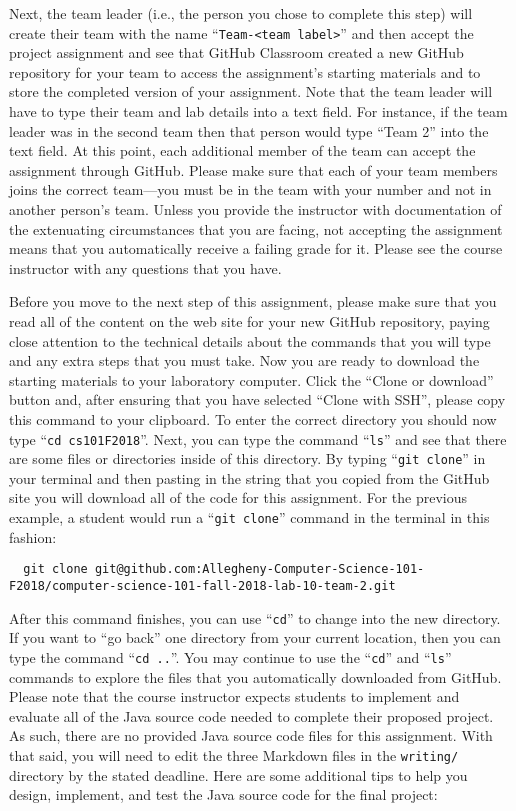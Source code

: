 \documentclass[11pt]{article}
\newcommand{\command}[1]{``\lstinline{#1}''}
\newcommand{\program}[1]{\lstinline{#1}}
\newcommand{\step}[1]{``{#1}''}
\begin{document}
Next, the team leader (i.e., the person you chose to complete this step) will
create their team with the name \command{Team-<team label>} and then accept the
project assignment and see that GitHub Classroom created a new GitHub repository
for your team to access the assignment's starting materials and to store the
completed version of your assignment. Note that the team leader will have to
type their team and lab details into a text field. For instance, if the team
leader was in the second team then that person would type ``Team 2'' into the
text field. At this point, each additional member of the team can accept the
assignment through GitHub. Please make sure that each of your team members joins
the correct team---you must be in the team with your number and not in another
person's team. Unless you provide the instructor with documentation of the
extenuating circumstances that you are facing, not accepting the assignment
means that you automatically receive a failing grade for it. Please see the
course instructor with any questions that you have.


Before you move to the next step of this assignment, please make sure that you
read all of the content on the web site for your new GitHub repository, paying
close attention to the technical details about the commands that you will type
and any extra steps that you must take. Now you are ready to download the
starting materials to your laboratory computer. Click the ``Clone or download''
button and, after ensuring that you have selected ``Clone with SSH'', please
copy this command to your clipboard. To enter the correct directory you should
now type \command{cd cs101F2018}. Next, you can type the command \command{ls}
and see that there are some files or directories inside of this directory. By
typing \command{git clone} in your terminal and then pasting in the string that
you copied from the GitHub site you will download all of the code for this
assignment. For the previous example, a student would run a \command{git clone}
command in the terminal in this fashion:

\begin{lstlisting}
  git clone git@github.com:Allegheny-Computer-Science-101-F2018/computer-science-101-fall-2018-lab-10-team-2.git
\end{lstlisting}

After this command finishes, you can use \command{cd} to change into the new
directory. If you want to \step{go back} one directory from your current
location, then you can type the command \command{cd ..}. You may continue to use
the \command{cd} and \command{ls} commands to explore the files that you
automatically downloaded from GitHub. Please note that the course instructor
expects students to implement and evaluate all of the Java source code needed to
complete their proposed project. As such, there are no provided Java source code
files for this assignment. With that said, you will need to edit the three
Markdown files in the \program{writing/} directory by the stated deadline. Here
are some additional tips to help you design, implement, and test the Java source
code for the final project:
\end{document}
